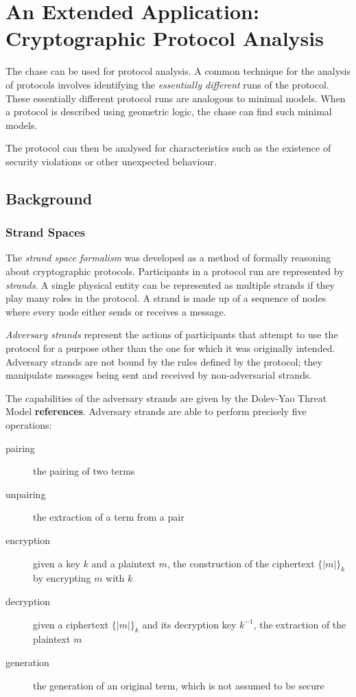 \section{An Extended Application: \\ Cryptographic Protocol Analysis}

	The chase can be used for protocol analysis. A common technique for the analysis
	of protocols involves identifying the \emph{essentially different} runs of
	the protocol. These essentially different protocol runs are analogous to
	minimal models. When a protocol is described using geometric logic, the
	chase can find such minimal models.

	The protocol can then be analysed for characteristics such as the
	existence of security violations or other unexpected behaviour.

	\subsection{Background}

		\subsubsection{Strand Spaces}

			The \emph{strand space formalism} was developed as a method of
			formally reasoning about cryptographic protocols. Participants in a
			protocol run are represented by \emph{strands}. A single physical
			entity can be represented as multiple strands if they play many
			roles in the protocol. A strand is made up of a sequence of nodes
			where every node either sends or receives a message.

			\emph{Adversary strands} represent the actions of participants
			that attempt to use the protocol for a purpose other than the one
			for which it was originally intended. Adversary strands are not
			bound by the rules defined by the protocol; they manipulate
			messages being sent and received by non-adversarial strands.

			The capabilities of the adversary strands are given by the
			Dolev-Yao Threat Model \textbf{references}. Adversary strands are
			able to perform precisely five operations:

			\begin{description}
			\item [pairing] the pairing of two terms
			\item [unpairing] the extraction of a term from a pair
			\item [encryption] given a key $k$ and a plaintext $m$, the construction of the ciphertext $\{|m|\}_k$ by encrypting $m$ with $k$
			\item [decryption] given a ciphertext $\{|m|\}_k$ and its decryption key $k^{-1}$, the extraction of the plaintext $m$
			\item [generation] the generation of an original term, which is not assumed to be secure
			\end{description}

